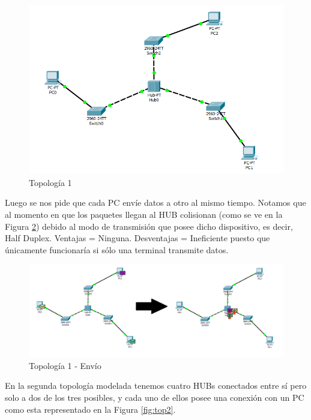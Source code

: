 \documentclass{article}
\begin{document}
\begin{figure}[h!]
\centering
\includegraphics[scale=0.4]{top1.png}
\caption{Topología 1}
\label{fig:top1}
\end{figure}

Luego se nos pide que cada PC envíe datos a otro al mismo tiempo. Notamos que al momento en que los paquetes llegan al HUB colisionan (como se ve en la Figura \ref{fig:topo1}) debido al modo de transmisión que posee dicho dispositivo, es decir, Half Duplex.
\newline Ventajas = Ninguna.
\newline Desventajas = Ineficiente puesto que únicamente funcionaría si sólo una terminal transmite datos.

\begin{figure}[h!]
\centering
\includegraphics[scale=0.3]{top1,2.png}
\caption{Topología 1 - Envío}
\label{fig:topo1}
\end{figure}

\newpage
En la segunda topología modelada tenemos cuatro HUBs conectados entre sí pero solo a dos de los tres posibles, y cada uno de ellos posee una conexión con un PC como esta representado en la Figura \ref{fig:top2}.
\end{document}
